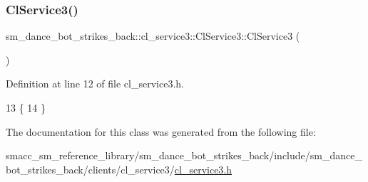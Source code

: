 \subsubsection{\texorpdfstring{Cl\+Service3()}{ClService3()}}
{\footnotesize\ttfamily sm\+\_\+dance\+\_\+bot\+\_\+strikes\+\_\+back\+::cl\+\_\+service3\+::\+Cl\+Service3\+::\+Cl\+Service3 (\begin{DoxyParamCaption}{ }\end{DoxyParamCaption})\hspace{0.3cm}{\ttfamily [inline]}}



Definition at line 12 of file cl\+\_\+service3.\+h.


\begin{DoxyCode}
13   \{
14   \}
\end{DoxyCode}


The documentation for this class was generated from the following file\+:\begin{DoxyCompactItemize}
\item 
smacc\+\_\+sm\+\_\+reference\+\_\+library/sm\+\_\+dance\+\_\+bot\+\_\+strikes\+\_\+back/include/sm\+\_\+dance\+\_\+bot\+\_\+strikes\+\_\+back/clients/cl\+\_\+service3/\hyperlink{sm__dance__bot__strikes__back_2include_2sm__dance__bot__strikes__back_2clients_2cl__service3_2cl__service3_8h}{cl\+\_\+service3.\+h}\end{DoxyCompactItemize}
